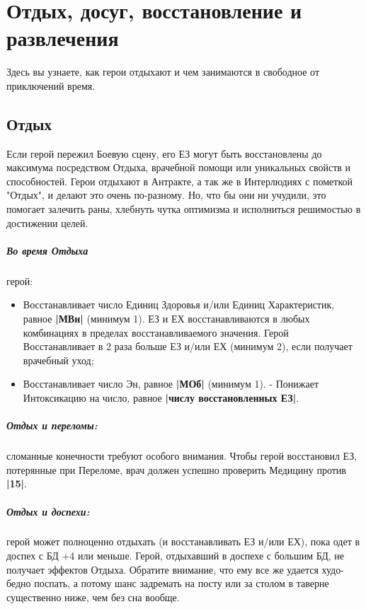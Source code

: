 \chapter{Отдых, досуг, восстановление и развлечения}
Здесь вы узнаете, как герои отдыхают и чем занимаются в свободное от приключений время. 

\section{Отдых}
Если герой пережил Боевую сцену, его ЕЗ могут быть восстановлены до максимума посредством Отдыха, врачебной помощи или уникальных свойств и способностей.
\newline Герои отдыхают в Антракте, а так же в Интерлюдиях с пометкой "Отдых", и делают это очень по-разному. Но, что бы они ни учудили, это помогает залечить раны, хлебнуть чутка оптимизма и исполниться решимостью в достижении целей.
\paragraph{Во время Отдыха} герой:
\begin{itemize}
  \item Восстанавливает число Единиц Здоровья и/или Единиц Характеристик, равное \textbf{|МВн|} (минимум 1). ЕЗ и ЕХ восстанавливаются в любых комбинациях в пределах восстанавливаемого значения. Герой Восстанавливает в 2 раза больше ЕЗ и/или ЕХ (минимум 2), если получает врачебный уход;
  \item Восстанавливает число Эн, равное \textbf{|МОб|} (минимум 1). - Понижает Интоксикацию на число, равное \textbf{|числу восстановленных ЕЗ|}.
\end{itemize}
\paragraph{Отдых и переломы:} сломанные конечности требуют особого внимания. Чтобы герой восстановил ЕЗ, потерянные при Переломе, врач должен успешно проверить Медицину против \textbf{|15|}. 
\paragraph{Отдых и доспехи:} герой может полноценно отдыхать (и восстанавливать ЕЗ и/или ЕХ), пока одет в доспех с БД +4 или меньше. Герой, отдыхавший в доспехе с большим БД, не получает эффектов Отдыха. Обратите внимание, что ему все же удается худо-бедно поспать, а потому шанс задремать на посту или за столом в таверне существенно ниже, чем без сна вообще.

